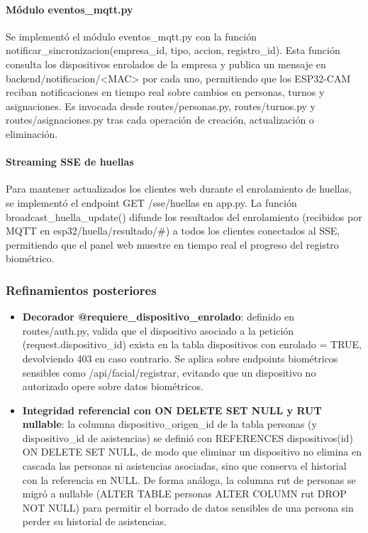 \paragraph{Módulo eventos\_mqtt.py}

Se implementó el módulo eventos\_mqtt.py con la función notificar\_sincronizacion(empresa\_id, tipo, accion, registro\_id). Esta función consulta los dispositivos enrolados de la empresa y publica un mensaje en backend/notificacion/<MAC> por cada uno, permitiendo que los ESP32-CAM reciban notificaciones en tiempo real sobre cambios en personas, turnos y asignaciones. Es invocada desde routes/personas.py, routes/turnos.py y routes/asignaciones.py tras cada operación de creación, actualización o eliminación.

\paragraph{Streaming SSE de huellas}

Para mantener actualizados los clientes web durante el enrolamiento de huellas, se implementó el endpoint GET /sse/huellas en app.py. La función broadcast\_huella\_update() difunde los resultados del enrolamiento (recibidos por MQTT en esp32/huella/resultado/\#) a todos los clientes conectados al SSE, permitiendo que el panel web muestre en tiempo real el progreso del registro biométrico.

\subsubsection{Refinamientos posteriores}

\begin{itemize}
    \item \textbf{Decorador @requiere\_dispositivo\_enrolado}: definido en routes/auth.py, valida que el dispositivo asociado a la petición (request.dispositivo\_id) exista en la tabla dispositivos con enrolado = TRUE, devolviendo 403 en caso contrario. Se aplica sobre endpoints biométricos sensibles como /api/facial/registrar, evitando que un dispositivo no autorizado opere sobre datos biométricos.

    \item \textbf{Integridad referencial con ON DELETE SET NULL y RUT nullable}: la columna dispositivo\_origen\_id de la tabla personas (y dispositivo\_id de asistencias) se definió con REFERENCES dispositivos(id) ON DELETE SET NULL, de modo que eliminar un dispositivo no elimina en cascada las personas ni asistencias asociadas, sino que conserva el historial con la referencia en NULL. De forma análoga, la columna rut de personas se migró a nullable (ALTER TABLE personas ALTER COLUMN rut DROP NOT NULL) para permitir el borrado de datos sensibles de una persona sin perder su historial de asistencias.
\end{itemize}


